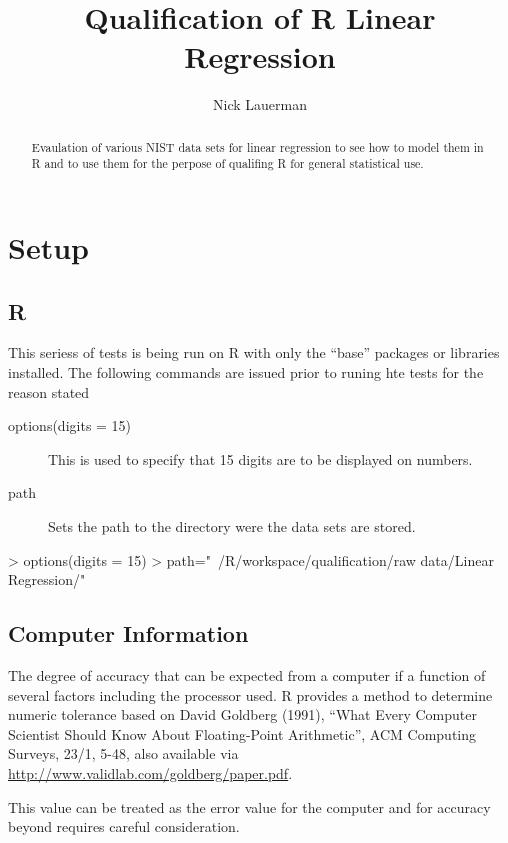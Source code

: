\documentclass[10pt]{article}
\title{Qualification of R Linear Regression}
\author{Nick Lauerman}
\begin{document}

\maketitle

\begin{abstract}
Evaulation of various NIST data sets for linear regression to see how to model
them in R and to use them for the perpose of qualifing R for general statistical
use.
\end{abstract}

\tableofcontents

\section{Setup}
\subsection{R}
This seriess of tests is being run on R with only the ``base'' packages or libraries
installed. The following commands are issued prior to runing hte tests for the 
reason stated

\begin{description}
   \item[options(digits = 15)] This is used to specify that 15 digits are to be displayed
   on numbers.
   \item[path] Sets the path to the directory were the data sets are stored.
\end{description}
\begin{Schunk}
\begin{Sinput}
> options(digits = 15)
> path="~/R/workspace/qualification/raw data/Linear Regression/"
\end{Sinput}
\end{Schunk}
\subsection{Computer Information}
The degree of accuracy  that can be expected from a computer if a function of several
factors including the processor used. R provides a method to determine 
numeric tolerance based on David Goldberg (1991), 
``What Every Computer Scientist Should Know About Floating-Point Arithmetic'', 
ACM Computing Surveys, 23/1, 5-48, also available via 
\url{http://www.validlab.com/goldberg/paper.pdf}.

This value can be treated as the error value for the computer and for accuracy 
beyond requires careful consideration.
\end{document}
